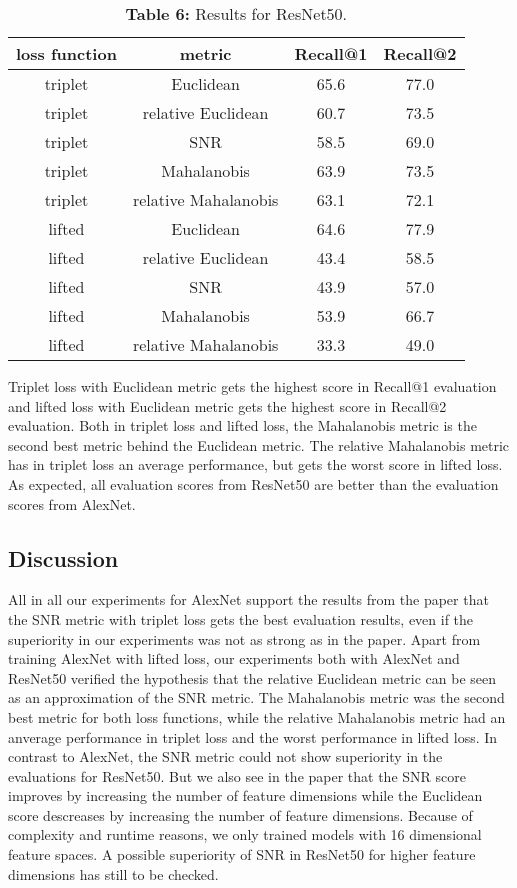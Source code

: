 \documentclass[12pt,paper=a4]{scrartcl}
\theoremstyle{break}
\begin{document}
\begin{table}[h]
\centering
  \begin{tabular}{| c | c | c | c |}
    \hline
     loss function & metric & Recall@1 & Recall@2 \\ \hline \hline
    triplet & Euclidean & 65.6 & 77.0 \\ \hline
    triplet & relative Euclidean & 60.7 & 73.5 \\ \hline
    triplet & SNR & 58.5 & 69.0 \\ \hline
    triplet & Mahalanobis & 63.9 & 73.5 \\ \hline
    triplet & relative Mahalanobis & 63.1 & 72.1 \\ \hline
    lifted & Euclidean & 64.6 & 77.9 \\ \hline
    lifted & relative Euclidean & 43.4 & 58.5 \\ \hline
    lifted & SNR & 43.9 & 57.0 \\ \hline
    lifted & Mahalanobis & 53.9 & 66.7 \\ \hline
    lifted & relative Mahalanobis & 33.3 & 49.0 \\ \hline

  \end{tabular}
  \caption{\textbf{Table 6:} Results for ResNet50.}
\end{table}
Triplet loss with Euclidean metric gets the highest score in Recall@1 evaluation and lifted loss with Euclidean metric gets the highest score in Recall@2 evaluation. Both in triplet loss and lifted loss, the Mahalanobis metric is the second best metric behind the Euclidean metric. The relative Mahalanobis metric has in triplet loss an average performance, but gets the worst score in lifted loss. As expected, all evaluation scores from ResNet50 are better than the evaluation scores from AlexNet.
\subsection{Discussion}
All in all our experiments for AlexNet support the results from the paper that the SNR metric with triplet loss gets the best evaluation results, even if the superiority in our experiments was not as strong as in the paper. Apart from training AlexNet with lifted loss, our experiments both with AlexNet and ResNet50 verified the hypothesis that the relative Euclidean metric can be seen as an approximation of the SNR metric. The Mahalanobis metric was the second best metric for both loss functions, while the relative Mahalanobis metric had an anverage performance in triplet loss and the worst performance in lifted loss. In contrast to AlexNet, the SNR metric could not show superiority in the evaluations for ResNet50. But we also see in the paper that the SNR score improves by increasing the number of feature dimensions while the Euclidean score descreases by increasing the number of feature dimensions. Because of complexity and runtime reasons, we only trained models with 16 dimensional feature spaces. A possible superiority of SNR in ResNet50 for higher feature dimensions has still to be checked.
\end{document}
